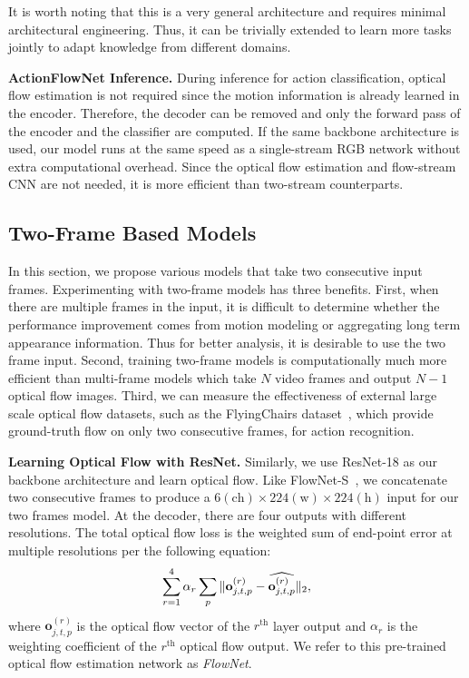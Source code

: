 \documentclass[10pt,twocolumn,letterpaper]{article}
\begin{document}
It is worth noting that this is a very general architecture and requires minimal architectural engineering.
Thus, it can be trivially extended to learn more tasks jointly to adapt knowledge from different domains.

\noindent\textbf{ActionFlowNet Inference.}
During inference for action classification, optical flow estimation is not required since the motion information is already learned in the encoder. Therefore, the decoder can be removed and only the forward pass of the encoder and the classifier are computed. If the same backbone architecture is used, our model runs at the same speed as a single-stream RGB network without extra computational overhead. Since the optical flow estimation and flow-stream CNN are not needed, it is more efficient than two-stream counterparts.

\subsection{Two-Frame Based Models}\label{sec:models}
In this section, we propose various models that take two consecutive input frames.
Experimenting with two-frame models has three benefits.
First, when there are multiple frames in the input, it is difficult to determine whether the performance improvement comes from motion modeling or aggregating long term appearance information.
Thus for better analysis, it is desirable to use the two frame input.
Second, training two-frame models is computationally much more efficient than multi-frame models which take $N$ video frames and output $N-1$ optical flow images.
Third, we can measure the effectiveness of external large scale optical flow datasets, such as the FlyingChairs dataset~\cite{FischerDIHHGSCB15}, which provide ground-truth flow on only two consecutive frames, for action recognition.

\noindent\textbf{Learning Optical Flow with ResNet.}
Similarly, we use ResNet-18 as our backbone architecture and learn optical flow.
Like FlowNet-S~\cite{FischerDIHHGSCB15}, we concatenate two consecutive frames to produce a $6(\text{ch})\times224(\text{w})\times224(\text{h})$ input for our two frames model.
At the decoder, there are four outputs with different resolutions.
The total optical flow loss is the weighted sum of end-point error at multiple resolutions per the following equation:
\vspace{-.5em}\begin{equation}
    \sum_{r=1}^{4} \alpha_r \sum_{p} \|\mathbf{o}_{j,t,p}^{(r)} - \widehat{\mathbf{o}_{j,t,p}^{(r)}} \|_2,
	\label{eq:loss_epe}
\vspace{-.5em}
\end{equation}%
where $\mathbf{o}_{j,t,p}^{(r)}$ is the optical flow vector of the $r^\text{th}$ layer output and
$\alpha_r$ is the weighting coefficient of the $r^\text{th}$ optical flow output.
We refer to this pre-trained optical flow estimation network as \emph{FlowNet}.
\end{document}
